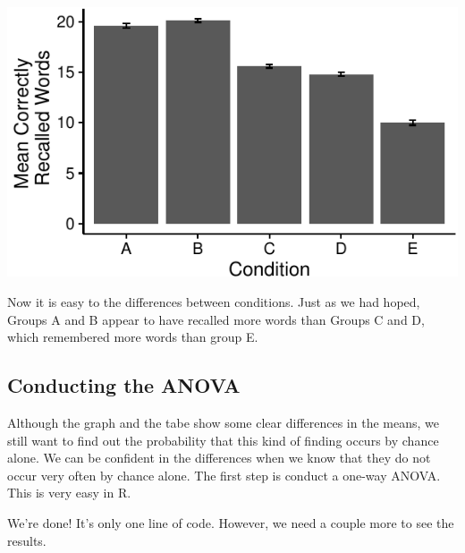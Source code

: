 \includegraphics{OneWay_files/figure-latex/unnamed-chunk-8-1}

Now it is easy to the differences between conditions. Just as we had
hoped, Groups A and B appear to have recalled more words than Groups C
and D, which remembered more words than group E.

\subsection{Conducting the ANOVA}\label{conducting-the-anova}

Although the graph and the tabe show some clear differences in the
means, we still want to find out the probability that this kind of
finding occurs by chance alone. We can be confident in the differences
when we know that they do not occur very often by chance alone. The
first step is conduct a one-way ANOVA. This is very easy in R.

\begin{Shaded}
\begin{Highlighting}[]
\end{Highlighting}
\end{Shaded}

We're done! It's only one line of code. However, we need a couple more
to see the results.

\begin{Shaded}
\begin{Highlighting}[]
\NormalTok{(}\NormalTok{)}
\end{Highlighting}
\end{Shaded}

